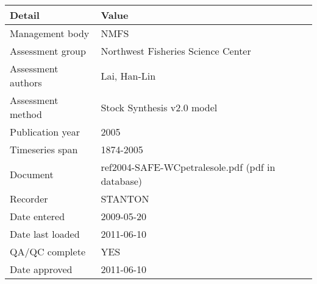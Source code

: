 \begin{table}[htb]
\centering
\begin{tabular}{lp{7cm}}
\toprule
Detail & Value \\
\midrule
Management body    & NMFS                                             \\
Assessment group   & Northwest Fisheries Science Center               \\
Assessment authors & Lai, Han-Lin                                     \\
Assessment method  & Stock Synthesis v2.0 model                       \\
Publication year   & 2005                                             \\
Timeseries span    & 1874-2005                                        \\
Document           & ref2004-SAFE-WCpetralesole.pdf (pdf in database) \\
Recorder           & STANTON                                          \\
Date entered       & 2009-05-20                                       \\
Date last loaded   & 2011-06-10                                       \\
QA/QC complete     & YES                                              \\
Date approved      & 2011-06-10                                       \\
\bottomrule
\end{tabular}
\label{tab:assessdet}
\end{table}
